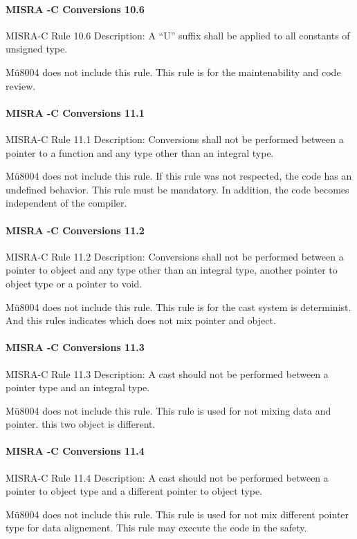 \paragraph{MISRA -C Conversions 10.6}
MISRA-C Rule 10.6 Description: A “U” suffix shall be applied to all constants of unsigned type.

Mü8004 does not include this rule. This rule is for the maintenability and code review.

\paragraph{MISRA -C Conversions 11.1}
MISRA-C Rule 11.1 Description: Conversions shall not be performed between a pointer to a function and any type other than an integral type.

Mü8004 does not include this rule. If this rule was not respected, the code has an undefined behavior. This rule must be mandatory. In addition, the code becomes independent of the compiler.

\paragraph{MISRA -C Conversions 11.2}
MISRA-C Rule 11.2 Description: Conversions shall not be performed between a pointer to object and any type other than an integral type, another pointer to object type or a pointer to void.

Mü8004 does not include this rule. This rule is for the cast system is determinist. And this rules indicates which does not mix pointer and object.

\paragraph{MISRA -C Conversions 11.3}
MISRA-C Rule 11.3 Description: A cast should not be performed between a pointer type and an integral type. 

Mü8004 does not include this rule. This rule is used for not mixing data and pointer. this two object is different.

\paragraph{MISRA -C Conversions 11.4}
MISRA-C Rule 11.4 Description: A cast should not be performed between a pointer to object type and a different pointer to object type.

Mü8004 does not include this rule. This rule is used for not mix different pointer type for data alignement. This rule may execute the code in the safety.

